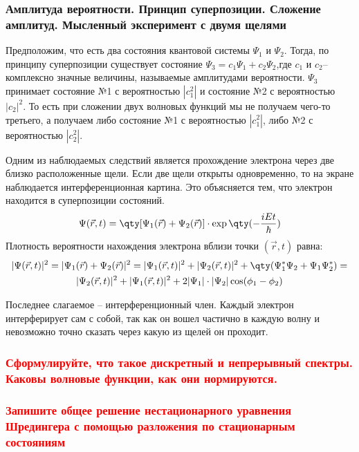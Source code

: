 \subsubsection{Амплитуда вероятности. Принцип суперпозиции. Сложение амплитуд. Мысленный эксперимент с двумя щелями}

Предположим, что есть два состояния квантовой системы $\Psi_1$ и $\Psi_2$.
Тогда, по принципу суперпозиции существует состояние $\Psi_3=c_1\Psi_1+c_2\Psi_2$,где
$c_1$ и  $c_2$-- комплексно значные величины, называемые амплитудами вероятности. $\Psi_3$ принимает состояние №1 с вероятностью $|c_1^2|$ и состояние №2 с вероятностью $|c_2|^2$. То есть при сложении двух волновых функций мы не получаем чего-то третьего, а получаем либо состояние №1 с вероятностью $|c_1^2|$, либо №2 с вероятностью $|c_2^2|$.

Одним из наблюдаемых следствий является прохождение электрона через две близко расположенные щели. Если две щели открыты одновременно, то на экране наблюдается интерференционная картина. Это объясняется тем, что электрон находится в суперпозиции состояний.
\begin{equation}
	\Psi(\vec{r},t)=\qty[\Psi_1(\vec{r})+\Psi_2(\vec{r})]\cdot\exp\qty(-\frac{iEt}{\hbar})
\end{equation}
Плотность вероятности нахождения электрона вблизи точки $(\vec{r},t)$ равна:
\begin{gather*}
	|\Psi(\vec{r},t)|^2=|\Psi_1(\vec{r})+\Psi_2(\vec{r})|^2=|\Psi_1(\vec{r},t)|^2+
	|\Psi_2(\vec{r},t)|^2+\qty(\Psi_1^*\Psi_2+\Psi_1\Psi_2^*)=\\
	|\Psi_2(\vec{r},t)|^2+|\Psi_1(\vec{r},t)|^2+2|\Psi_1|\cdot|\Psi_2|\cos(\phi_1-\phi_2)
\end{gather*}

Последнее слагаемое -- интерференционный член. Каждый электрон интерферирует сам  с собой, так как он вошел частично в каждую волну и невозможно точно сказать через какую из щелей он проходит.

\subsubsection{\textcolor{red} {Сформулируйте, что такое дискретный и непрерывный спектры. Каковы волновые
функции, как они нормируются.} }

\subsubsection{\textcolor{red} {Запишите общее решение нестационарного уравнения Шредингера с помощью
разложения по стационарным состояниям} }
